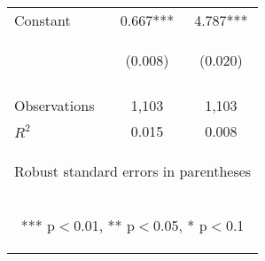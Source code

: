 \documentclass{article} %
\begin{document}
\begin{table}[H]
\begin{center}
\begin{tabular}{lcc}
Constant & 0.667*** & 4.787*** \\
 & \begin{footnotesize}(0.008)\end{footnotesize} & \begin{footnotesize}(0.020)\end{footnotesize} \\
\vspace{4pt} & \begin{footnotesize}\end{footnotesize} & \begin{footnotesize}\end{footnotesize} \\
Observations & 1,103 & 1,103 \\
 $R^2$ & 0.015 & 0.008 \\ \hline
\multicolumn{3}{c}{\begin{footnotesize} Robust standard errors in parentheses\end{footnotesize}} \\
\multicolumn{3}{c}{\begin{footnotesize} *** p$<$0.01, ** p$<$0.05, * p$<$0.1\end{footnotesize}} \\
\end{tabular}
\end{center}

\end{table}
\end{document}
